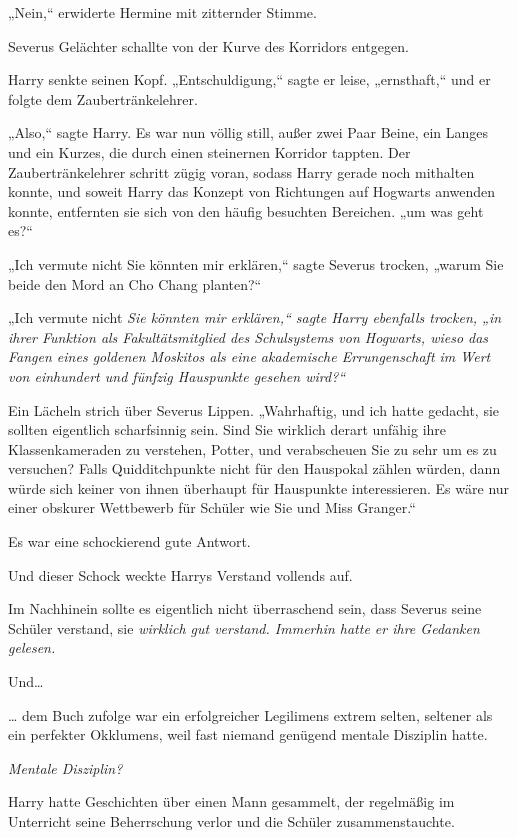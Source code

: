 {„Nein,“ erwiderte Hermine mit zitternder Stimme.

Severus Gelächter schallte von der Kurve des Korridors entgegen.

Harry senkte seinen Kopf. „Entschuldigung,“ sagte er leise, „ernsthaft,“ und er folgte dem Zaubertränkelehrer.

„Also,“ sagte Harry. Es war nun völlig still, außer zwei Paar Beine, ein Langes und ein Kurzes, die durch einen steinernen Korridor tappten. Der Zaubertränkelehrer schritt zügig voran, sodass Harry gerade noch mithalten konnte, und soweit Harry das Konzept von Richtungen auf Hogwarts anwenden konnte, entfernten sie sich von den häufig besuchten Bereichen. „um was geht es?“

„Ich vermute nicht Sie könnten mir erklären,“ sagte Severus trocken, „warum Sie beide den Mord an Cho Chang planten?“

„Ich vermute nicht \emph{Sie könnten mir erklären,“ sagte Harry ebenfalls trocken, „in ihrer Funktion als Fakultätsmitglied des Schulsystems von Hogwarts, wieso das Fangen eines goldenen Moskitos als eine akademische Errungenschaft im Wert von einhundert und fünfzig Hauspunkte gesehen wird?“}

Ein Lächeln strich über Severus Lippen. „Wahrhaftig, und ich hatte gedacht, sie sollten eigentlich scharfsinnig sein. Sind Sie wirklich derart unfähig ihre Klassenkameraden zu verstehen, Potter, und verabscheuen Sie zu sehr um es zu versuchen? Falls Quidditchpunkte nicht für den Hauspokal zählen würden, dann würde sich keiner von ihnen überhaupt für Hauspunkte interessieren. Es wäre nur einer obskurer Wettbewerb für Schüler wie Sie und Miss Granger.“

Es war eine schockierend gute Antwort.

Und dieser Schock weckte Harrys Verstand vollends auf.

Im Nachhinein sollte es eigentlich nicht überraschend sein, dass Severus seine Schüler verstand, sie \emph{wirklich gut verstand. Immerhin hatte er ihre Gedanken gelesen.}

Und…

… dem Buch zufolge war ein erfolgreicher Legilimens extrem selten, seltener als ein perfekter Okklumens, weil fast niemand genügend mentale Disziplin hatte.

\emph{Mentale Disziplin?}

Harry hatte Geschichten über einen Mann gesammelt, der regelmäßig im Unterricht seine Beherrschung verlor und die Schüler zusammenstauchte.

}
